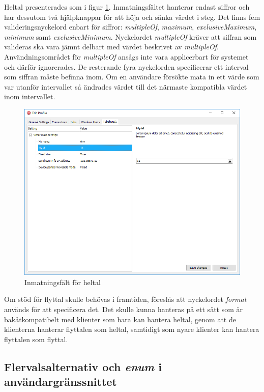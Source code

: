 Heltal presenterades som i figur \ref{fig:heltal}. Inmatningsfältet hanterar endast siffror och har dessutom två hjälpknappar för att höja och sänka värdet i steg. Det finns fem valideringsnyckelord enbart för siffror: \textit{multipleOf}, \textit{maximum}, \textit{exclusiveMaximum}, \textit{minimum} samt \textit{exclusiveMinimum}. Nyckelordet \textit{multipleOf} kräver att siffran som valideras ska vara jämnt delbart med värdet beskrivet av \textit{multipleOf}. Användningsområdet för \textit{multipleOf} ansågs inte vara applicerbart för systemet och därför ignorerades. De resterande fyra nyckelorden specificerar ett interval som siffran måste befinna inom. Om en användare försökte mata in ett värde som var utanför intervallet så ändrades värdet till det närmaste kompatibla värdet inom intervallet. \cite{Andrews2018}

\begin{figure}
	\includegraphics[width=\textwidth]{./images/gui/heltal.png}
	\vspace{-1.7em}
	\caption{Inmatningsfält för heltal}
	\label{fig:heltal}
\end{figure}

Om stöd för flyttal skulle behövas i framtiden, föreslås att nyckelordet \textit{format} används för att specificera det. Det skulle kunna hanteras på ett sätt som är bakåtkompatibelt med klienter som bara kan hantera heltal, genom att de klienterna hanterar flyttalen som heltal, samtidigt som nyare klienter kan hantera flyttalen som flyttal.

\subsection{Flervalsalternativ och \textit{enum} i användargränssnittet}
\label{sec:arbetet:gui:enum}

